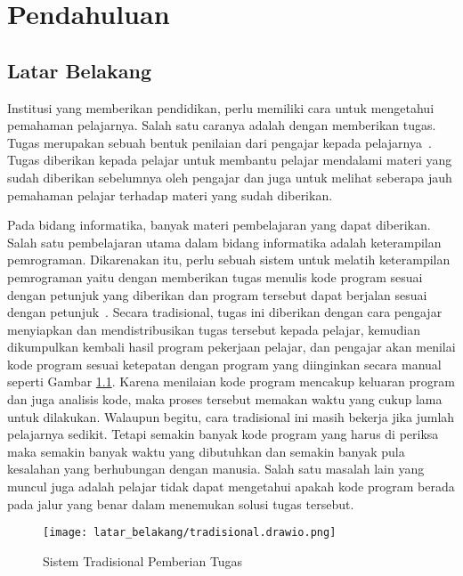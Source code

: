 \chapter{Pendahuluan}
\label{chap:intro}

\section{Latar Belakang}
\label{sec:1:latar_belakang}

Institusi yang memberikan pendidikan, perlu memiliki cara untuk mengetahui pemahaman pelajarnya. Salah satu caranya adalah dengan memberikan tugas. Tugas merupakan sebuah bentuk penilaian dari pengajar kepada pelajarnya~\cite{febriana:plagiarisme}. Tugas diberikan kepada pelajar untuk membantu pelajar mendalami materi yang sudah diberikan sebelumnya oleh pengajar dan juga untuk melihat seberapa jauh pemahaman pelajar terhadap materi yang sudah diberikan.

Pada bidang informatika, banyak materi pembelajaran yang dapat diberikan. Salah satu pembelajaran utama dalam bidang informatika adalah keterampilan pemrograman. Dikarenakan itu, perlu sebuah sistem untuk melatih keterampilan pemrograman yaitu dengan memberikan tugas menulis kode program sesuai dengan petunjuk yang diberikan dan program tersebut dapat berjalan sesuai dengan petunjuk~\cite{onder:judge}. Secara tradisional, tugas ini diberikan dengan cara pengajar menyiapkan dan mendistribusikan tugas tersebut kepada pelajar, kemudian dikumpulkan kembali hasil program pekerjaan pelajar, dan pengajar akan menilai kode program sesuai ketepatan dengan program yang diinginkan secara manual seperti Gambar \ref{fig:1:tradisional}. Karena menilaian kode program mencakup keluaran program dan juga analisis kode, maka proses tersebut memakan waktu yang cukup lama untuk dilakukan. Walaupun begitu, cara tradisional ini masih bekerja jika jumlah pelajarnya sedikit.
Tetapi semakin banyak kode program yang harus di periksa maka semakin banyak waktu yang dibutuhkan dan semakin banyak pula kesalahan yang berhubungan dengan manusia. Salah satu masalah lain yang muncul juga adalah pelajar tidak dapat mengetahui apakah kode program berada pada jalur yang benar dalam menemukan solusi tugas tersebut.

\begin{figure}[H]
    \centering
    \texttt{[image: latar\_belakang/tradisional.drawio.png]}
    \caption[Sistem Tradisional Pemberian Tugas]{Sistem Tradisional Pemberian Tugas}
    \label{fig:1:tradisional}
\end{figure}

